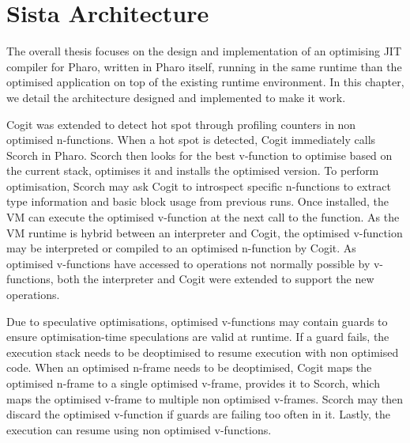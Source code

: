 \documentclass[a4paper,12pt,twoside]{../includes/ThesisStyle}
\begin{document}
\fi

\chapter{Sista Architecture}
\label{chap:architecture}
\minitoc

The overall thesis focuses on the design and implementation of an optimising JIT compiler for Pharo, written in Pharo itself, running in the same runtime than the optimised application on top of the existing runtime environment. In this chapter, we detail the architecture designed and implemented to make it work.

Cogit was extended to detect hot spot through profiling counters in non optimised n-functions. When a hot spot is detected, Cogit immediately calls Scorch in Pharo. Scorch then looks for the best v-function to optimise based on the current stack, optimises it and installs the optimised version. To perform optimisation, Scorch may ask Cogit to introspect specific n-functions to extract type information and basic block usage from previous runs. Once installed, the VM can execute the optimised v-function at the next call to the function. As the VM runtime is hybrid between an interpreter and Cogit, the optimised v-function may be interpreted or compiled to an optimised n-function by Cogit. As optimised v-functions have accessed to operations not normally possible by v-functions, both the interpreter and Cogit were extended to support the new operations.

Due to speculative optimisations, optimised v-functions may contain guards to ensure optimisation-time speculations are valid at runtime. If a guard fails, the execution stack needs to be deoptimised to resume execution with non optimised code. When an optimised n-frame needs to be deoptimised, Cogit maps the optimised n-frame to a single optimised v-frame, provides it to Scorch, which maps the optimised v-frame to multiple non optimised v-frames. Scorch may then discard the optimised v-function if guards are failing too often in it. Lastly, the execution can resume using non optimised v-functions.

\end{document}
